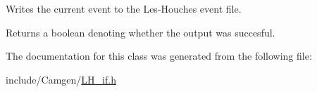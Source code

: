 Writes the current event to the Les-\/\+Houches event file. 

Returns a boolean denoting whether the output was succesful. 

The documentation for this class was generated from the following file\+:\begin{DoxyCompactItemize}
\item 
include/\+Camgen/\hyperlink{a00678}{L\+H\+\_\+if.\+h}\end{DoxyCompactItemize}

